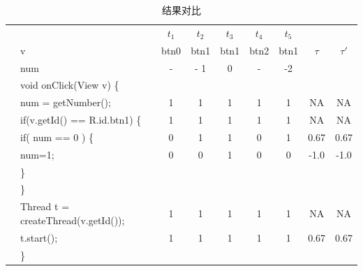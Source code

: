 \begin{table}[!hb]
	
	\caption{结果对比}

	
	\label{tab:result}
	\begin{center}
		\scriptsize	
		
		
		
		\begin{tabular}{|rl*{5} {|c}|c|c|}
			
						\hline
			
			&                    & $t_1$ & $t_2$ & $t_3$ & $t_4$ & $t_5$ & ~&  ~\\
			&v &btn0& btn1& btn1& btn2 &btn1 & $\tau$ &  $\tau'$   \\
			&num&   - & - 1& 0& -& -2& &\\
			\hline
			
			&void onClick(View v) \{                       &   &   &   &   &   &      &         \\
			
			&\quad num = getNumber();                   & 1 & 1 & 1 & 1 & 1 &  NA  &  NA    \\
			
			&\quad if(v.getId() == R.id.btn1) \{           & 1 & 1 & 1 & 1 & 1 &  NA    &  NA \\
			
			&\quad \quad if( num == 0 ) \{                    & 0 & 1 & 1 & 0 & 1 & 0.67   & 0.67 \\
			
			&\quad \quad \quad num=1;                         & 0 & 0 & 1 & 0 & 0 & -1.0  &-1.0\\
			
			&\quad \quad \}                                   &   &   &   &   &   &       &            \\
			
			&\quad   \}                                       &   &   &   &   &   &      &            \\
			
			&\quad Thread t = createThread(v.getId());          & 1 & 1 & 1 & 1 & 1 & NA&  NA  \\
			
			&\quad t.start();                                 & 1 & 1 & 1 & 1 & 1 & 0.67   & 0.67 \\
			
			&\}                                              &   &   &   &   &   &      &             \\
			

\end{tabular}
\end{center}
\end{table}
